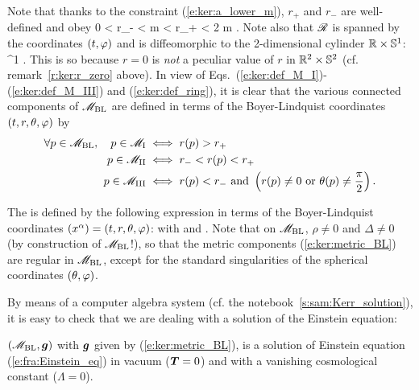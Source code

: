 Note that thanks to the constraint (\ref{e:ker:a_lower_m}), $r_+$ and $r_-$
are well-defined and obey
\be \label{e:ker:order_r_pm}
    0 < r_- < m < r_+ < 2 m .
\ee
Note also that $\mathscr{R}$ is spanned by the coordinates $(t,\varphi)$ and is diffeomorphic to the 2-dimensional cylinder $\mathbb{R}\times\mathbb{S}^1$:
\be \label{e:ker:ring_R_S1}
    \ring \simeq \R\times\SS^1 .
\ee
This is so because $r=0$ is \emph{not} a peculiar value of $r$ in $\mathbb{R}^2\times\mathbb{S}^2$
(cf. remark~\ref{r:ker:r_zero} above).
In view of Eqs.~(\ref{e:ker:def_M_I})-(\ref{e:ker:def_M_III}) and (\ref{e:ker:def_ring}), it is clear that
the various connected components of $\mathscr{M}_{\rm BL}$ are defined in terms of the
Boyer-Lindquist coordinates $(t,r,\theta,\varphi)$ by
\begin{subequations}
\label{e:ker:M_I_III_r}
\begin{align}
  \forall p \in  \mathscr{M}_{\rm BL},\quad p \in \mathscr{M}_{\rm I} & \iff r(p) > r_+ \\
    \quad p \in \mathscr{M}_{\rm II} & \iff r_- < r(p) < r_+ \\
    \quad p \in \mathscr{M}_{\rm III} & \iff r(p) < r_-\ \mbox{and}\
    \left( r(p) \not=0 \ \mbox{or}\ \theta(p) \not=\frac{\pi}{2} \right) .
\end{align}
\end{subequations}


The  is defined by the following
expression in terms of the Boyer-Lindquist coordinates $(x^\alpha)=(t,r,\theta,\varphi)$:
\be \label{e:ker:metric_BL}
\ee
with
\be \label{e:ker:def_rho2}
\ee
and
\be \label{e:ker:def_Delta}
     .
\ee
Note that on $\mathscr{M}_{\rm BL}$, $\rho\not=0$ and $\Delta\not=0$ (by construction
of $\mathscr{M}_{\rm BL}$!), so that the metric components (\ref{e:ker:metric_BL})
are regular in $\mathscr{M}_{\rm BL}$, except for the standard singularities of
the spherical coordinates $(\theta,\varphi)$.

By means of a computer algebra system (cf. the notebook~\ref{s:sam:Kerr_solution}),
it is easy to check that we are dealing with a solution of the Einstein equation:
\begin{prop}
$\left(\mathscr{M}_{\rm BL},\bm{g}\right)$ with $\bm{g}$ given
by (\ref{e:ker:metric_BL}), is a solution of Einstein equation
(\ref{e:fra:Einstein_eq})
in vacuum ($\bm{T}=0$) and with a vanishing cosmological constant ($\Lambda=0$).
\end{prop}

